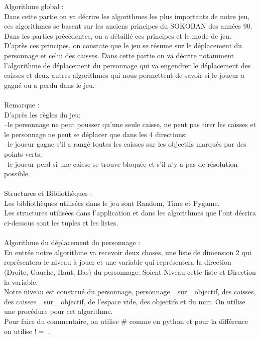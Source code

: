 \documentclass{article}
\begin{document}
Algorithme global :\\ Dans cette partie on va décrire les algorithmes les plus importants de notre jeu, ces algorithmes se basent sur les anciens principes du SOKOBAN des années 90.
Dans les parties précédentes, on a détaillé ces principes et le mode de jeu. D'après ces principes, on constate que le jeu se résume sur le déplacement du personnage et celui des caisses.
Dans cette partie on va décrire notamment l'algorithme de déplacement du personnage qui va engendrer le déplacement des caisses et deux autres algorithmes qui nous permettent de savoir si le joueur a gagné ou a perdu dans le jeu.
\\
\\
Remarque :
\\
D'après les règles du jeu:
\\--le personnage ne peut pousser qu'une seule caisse, ne peut pas tirer les caisses et le personnage ne peut se déplacer que dans les 4 directions;
\\--le joueur gagne s'il a rangé toutes les caisses sur les objectifs marqués par des points verts;
\\--le joueur perd si une caisse se trouve bloquée et s'il n'y a pas de résolution possible.
\\
\\
Structures et Bibliothèques :
\\
Les bibliothèques utilisées dans le jeu sont Random, Time et Pygame.
\\Les structures utilisées dans l'application et dans les algorithmes que l'ont décrira ci-dessous sont les tuples et les listes.
\\\\
Algorithme du déplacement du personnage :
\\
En entrée notre algorithme va recevoir deux choses, une liste de dimension 2 qui représentera le niveau à jouer et une variable qui représentera la direction (Droite, Gauche, Haut, Bas) du personnage.
Soient Niveau cette liste et Direction la variable.\\
Notre niveau est constitué du personnage, personnage\_ sur\_ objectif, des caisses, des caisses\_ sur\_ objectif, de l'espace vide, des objectifs et du mur. On utilise une procédure pour cet algorithme.\\
Pour faire du commentaire, on utilise \#  comme en python et pour la différence on utilise $ != $ .
\end{document}
